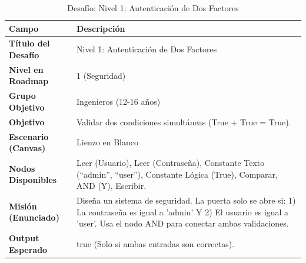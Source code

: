 \begin{table}[H]
    \centering
    \caption{Desafío: Nivel 1: Autenticación de Dos Factores}
    \label{tab:desafio-ing-1}
    \begingroup
    \renewcommand{\arraystretch}{\TableRowStretch}
    \begin{tabularx}{\textwidth}{ l X }
        \hline
        \textbf{Campo}              & \textbf{Descripción}                                                                                                                                                                \\
        \hline
        \textbf{Título del Desafío} & Nivel 1: Autenticación de Dos Factores                                                                                                                                              \\
        \textbf{Nivel en Roadmap}   & 1 (Seguridad)                                                                                                                                                                       \\
        \textbf{Grupo Objetivo}     & Ingenieros (12-16 años)                                                                                                                                                             \\
        \textbf{Objetivo}           & Validar dos condiciones simultáneas (True + True = True).                                                                                                                           \\
        \textbf{Escenario (Canvas)} & Lienzo en Blanco                                                                                                                                                                    \\
        \textbf{Nodos Disponibles}  & Leer (Usuario), Leer (Contraseña), Constante Texto (“admin”, “user”), Constante Lógica (True), Comparar, AND (Y), Escribir.                                                         \\
        \textbf{Misión (Enunciado)} & Diseña un sistema de seguridad. La puerta solo se abre si: 1) La contraseña es igual a 'admin' Y 2) El usuario es igual a 'user'. Usa el nodo AND para conectar ambas validaciones. \\
        \textbf{Output Esperado}    & true (Solo si ambas entradas son correctas).                                                                                                                                        \\
        \hline
    \end{tabularx}
    \endgroup
\end{table}


